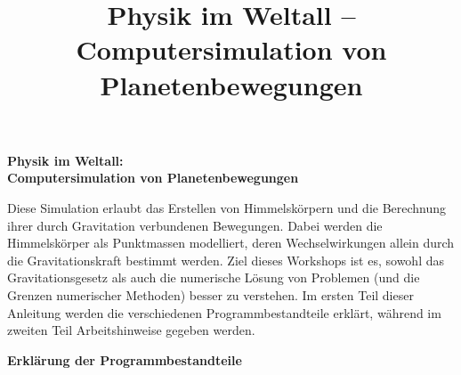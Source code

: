\documentclass{scrartcl}
\title{Physik im Weltall -- Computersimulation von Planetenbewegungen}
\date{}
\begin{document}
\begin{center}
    {\huge\textbf{\sffamily Physik im Weltall:\\ Computersimulation von Planetenbewegungen}\\[1cm]}
\end{center}
Diese Simulation erlaubt das Erstellen von Himmelskörpern und die Berechnung ihrer durch Gravitation verbundenen Bewegungen.
Dabei werden die Himmelskörper als Punktmassen modelliert, deren Wechselwirkungen allein durch die Gravitationskraft bestimmt werden.
Ziel dieses Workshops ist es, sowohl das Gravitationsgesetz als auch die numerische Lösung von Problemen (und die Grenzen numerischer Methoden) besser zu verstehen.
Im ersten Teil dieser Anleitung werden die verschiedenen Programmbestandteile erklärt, während im zweiten Teil Arbeitshinweise gegeben werden.
\\[0.5cm]
\begin{center}
        {\Large\textbf{\sffamily Erklärung der Programmbestandteile}}\\[.5cm]
\end{center}
        \lstset{basicstyle=\texttt, tabsize=2, morekeywords=Programmname, keywordstyle=\textsc}%
\end{document}
